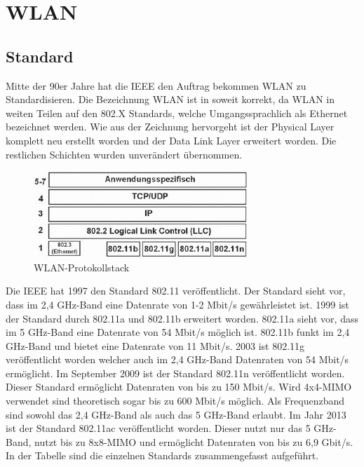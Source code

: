 \section{WLAN}
\subsection{Standard}
Mitte der 90er Jahre hat die \ac{IEEE} den Auftrag bekommen WLAN zu Standardisieren. Die Bezeichnung WLAN ist in soweit korrekt, da WLAN in weiten Teilen auf den 802.X Standards, welche Umgangssprachlich als Ethernet bezeichnet werden. Wie aus der Zeichnung  hervorgeht ist der Physical Layer komplett neu erstellt worden und der Data Link Layer erweitert worden. Die restlichen Schichten wurden unverändert übernommen.

\begin{figure} [htb]
\begin{centering}
\includegraphics{Bilder/Kapitel2/osi_wlan.jpg}
\caption[WLAN-Protokollstack]{WLAN-Protokollstack \cite{SWB-430171331}}
\label{osi-wlan}
\end{centering}
\end{figure}

Die \ac{IEEE} hat 1997 den Standard 802.11 veröffentlicht. Der Standard sieht vor, dass im 2,4 GHz-Band eine Datenrate von 1-2 Mbit/s gewährleistet ist. 1999 ist der Standard durch 802.11a und 802.11b erweitert worden. 802.11a sieht vor, dass im 5 GHz-Band eine Datenrate von 54 Mbit/s möglich ist. 802.11b funkt im 2,4 GHz-Band und bietet eine Datenrate von 11 Mbit/s. 2003 ist 802.11g veröffentlicht worden welcher auch im 2,4 GHz-Band Datenraten von 54 Mbit/s ermöglicht. Im September 2009 ist der Standard 802.11n veröffentlicht worden. Dieser Standard ermöglicht Datenraten von bis zu 150 Mbit/s. Wird 4x4-\ac{MIMO} verwendet sind theoretisch sogar bis zu 600 Mbit/s möglich. Als Frequenzband sind sowohl das 2,4 GHz-Band als auch das 5 GHz-Band erlaubt. Im Jahr 2013 ist der Standard 802.11ac veröffentlicht worden. Dieser nutzt nur das 5 GHz-Band, nutzt bis zu 8x8-\ac{MIMO} und ermöglicht Datenraten von bis zu 6,9 Gbit/s. In der Tabelle  sind die einzelnen Standards zusammengefasst aufgeführt.


